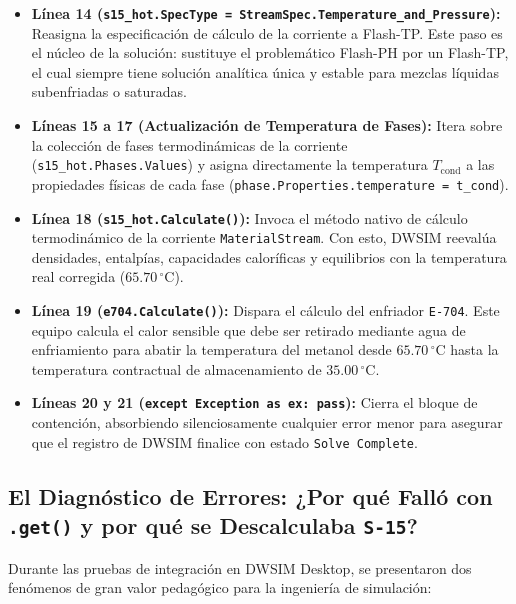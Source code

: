 \documentclass[11pt,a4paper]{article}
\begin{document}
\begin{itemize}
    \item \textbf{Línea 14 (\texttt{s15\_hot.SpecType = StreamSpec.Temperature\_and\_Pressure}):}
    Reasigna la especificación de cálculo de la corriente a Flash-TP. Este paso es el núcleo de la solución: sustituye el problemático Flash-PH por un Flash-TP, el cual siempre tiene solución analítica única y estable para mezclas líquidas subenfriadas o saturadas.

    \item \textbf{Líneas 15 a 17 (Actualización de Temperatura de Fases):}
    Itera sobre la colección de fases termodinámicas de la corriente (\texttt{s15\_hot.Phases.Values}) y asigna directamente la temperatura $T_{\text{cond}}$ a las propiedades físicas de cada fase (\texttt{phase.Properties.temperature = t\_cond}).

    \item \textbf{Línea 18 (\texttt{s15\_hot.Calculate()}):}
    Invoca el método nativo de cálculo termodinámico de la corriente \texttt{MaterialStream}. Con esto, DWSIM reevalúa densidades, entalpías, capacidades caloríficas y equilibrios con la temperatura real corregida ($65.70\,^\circ\text{C}$).

    \item \textbf{Línea 19 (\texttt{e704.Calculate()}):}
    Dispara el cálculo del enfriador \texttt{E-704}. Este equipo calcula el calor sensible que debe ser retirado mediante agua de enfriamiento para abatir la temperatura del metanol desde $65.70\,^\circ\text{C}$ hasta la temperatura contractual de almacenamiento de $35.00\,^\circ\text{C}$.

    \item \textbf{Líneas 20 y 21 (\texttt{except Exception as ex: pass}):}
    Cierra el bloque de contención, absorbiendo silenciosamente cualquier error menor para asegurar que el registro de DWSIM finalice con estado \texttt{Solve Complete}.
\end{itemize}

\subsection{El Diagnóstico de Errores: ¿Por qué Falló con \texttt{.get()} y por qué se Descalculaba \texttt{S-15}?}
Durante las pruebas de integración en DWSIM Desktop, se presentaron dos fenómenos de gran valor pedagógico para la ingeniería de simulación:
\end{document}
